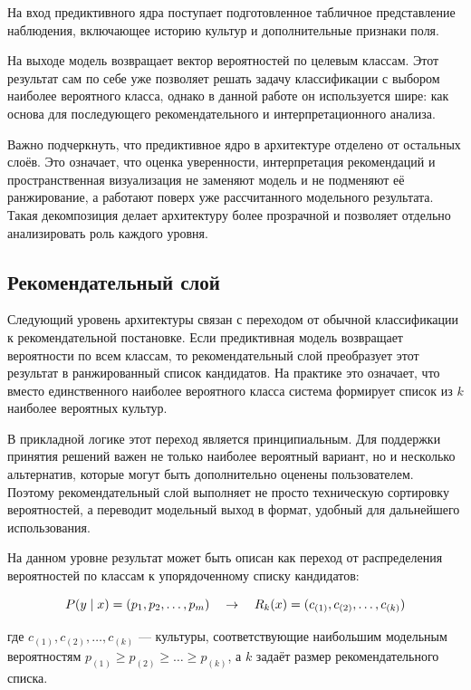 На вход предиктивного ядра поступает подготовленное табличное представление наблюдения, включающее историю культур и
дополнительные признаки поля.

На выходе модель возвращает вектор вероятностей по целевым классам. Этот результат сам по себе уже позволяет решать
задачу классификации с выбором наиболее вероятного класса, однако в данной работе он используется шире: как основа для последующего рекомендательного и
интерпретационного анализа.

Важно подчеркнуть, что предиктивное ядро в архитектуре отделено от остальных слоёв. Это означает, что
оценка уверенности, интерпретация рекомендаций и пространственная визуализация не заменяют модель и не подменяют её
ранжирование, а работают поверх уже рассчитанного модельного результата. Такая декомпозиция делает архитектуру более прозрачной и
позволяет отдельно анализировать роль каждого уровня.

\subsection{Рекомендательный слой}

Следующий уровень архитектуры связан с переходом от обычной классификации к рекомендательной постановке. Если
предиктивная модель возвращает вероятности по всем классам, то рекомендательный слой преобразует этот результат в
ранжированный список кандидатов. На практике это означает, что вместо единственного наиболее вероятного класса система
формирует список из \(k\) наиболее вероятных культур.

В прикладной логике этот переход является принципиальным. Для поддержки принятия решений важен не только наиболее
вероятный вариант, но и несколько альтернатив, которые могут быть дополнительно оценены пользователем. Поэтому
рекомендательный слой выполняет не просто техническую сортировку вероятностей, а переводит модельный выход в формат,
удобный для дальнейшего использования.

На данном уровне результат может быть описан как переход от распределения вероятностей по классам к упорядоченному
списку кандидатов:

\begin{equation}
\notag
P(y \mid x) = (p_1, p_2, \ldots, p_m)
\quad \rightarrow \quad
R_k(x) = (c_{(1)}, c_{(2)}, \ldots, c_{(k)})
\end{equation}

где \(c_{(1)}, c_{(2)}, \ldots, c_{(k)}\) --- культуры, соответствующие наибольшим модельным вероятностям
\(p_{(1)} \geq p_{(2)} \geq \ldots \geq p_{(k)}\), а \(k\) задаёт размер рекомендательного списка.

